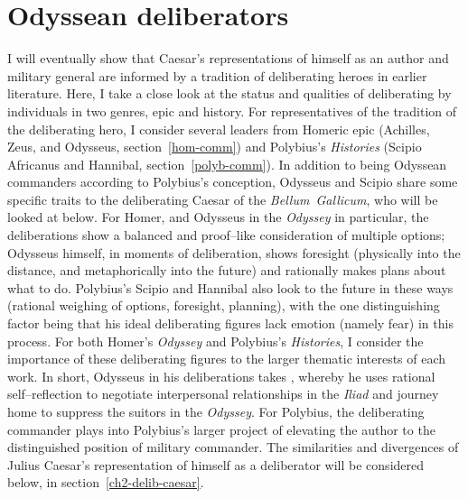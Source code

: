 \documentclass[12pt,letterpaper,oneside,final]{memoir}
\begin{document}
\section{Odyssean deliberators}
\label{comm}
I will eventually show that Caesar's representations of himself as an author and military general are informed by a tradition of deliberating heroes in earlier literature. Here, I take a close look at the status and qualities of deliberating by individuals in two genres, epic and history. For representatives of the tradition of the deliberating hero, I consider several leaders from Homeric epic (Achilles, Zeus, and Odysseus, section~\ref{hom-comm}) and Polybius's \emph{Histories} (Scipio Africanus and Hannibal, section~\ref{polyb-comm}). In addition to being Odyssean commanders according to Polybius's conception, Odysseus and Scipio share some specific traits to the deliberating Caesar of the \emph{Bellum~Gallicum}, who will be looked at below. For Homer, and Odysseus in the \emph{Odyssey} in particular, the deliberations show a balanced and proof--like consideration of multiple options; Odysseus himself, in moments of deliberation, shows foresight (physically into the distance, and metaphorically into the future) and rationally makes plans about what to do. Polybius's Scipio and Hannibal also look to the future in these ways (rational weighing of options, foresight, planning), with the one distinguishing factor being that his ideal deliberating figures lack emotion (namely fear) in this process. For both Homer's \emph{Odyssey} and Polybius's \emph{Histories}, I consider the importance of these deliberating figures to the larger thematic interests of each work. In short, Odysseus in his deliberations takes , whereby he uses rational self--reflection to negotiate interpersonal relationships in the \emph{Iliad} and journey home to suppress the suitors in the \emph{Odyssey}. For Polybius, the deliberating commander plays into Polybius's larger project of elevating the author to the distinguished position of military commander. The similarities and divergences of Julius Caesar's representation of himself as a deliberator will be considered below, in section~\ref{ch2-delib-caesar}. 
\end{document}
